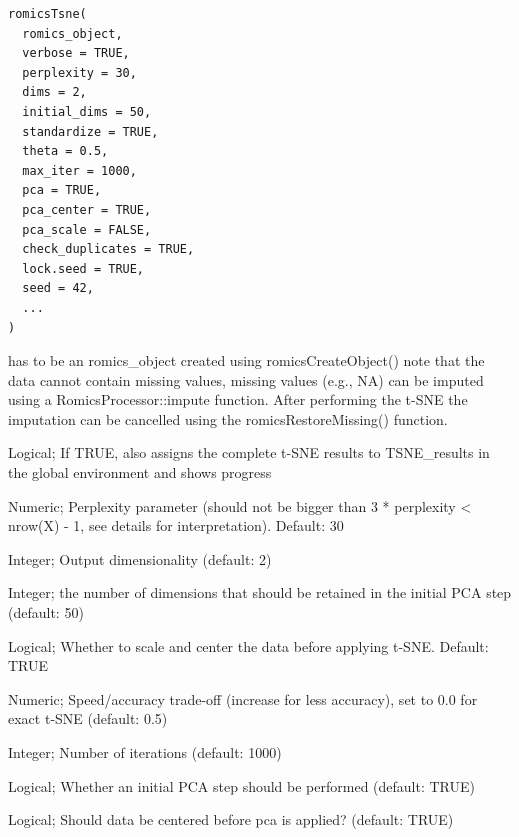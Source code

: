 \documentclass[a4paper]{book}
\begin{document}
%
\begin{Usage}
\begin{verbatim}
romicsTsne(
  romics_object,
  verbose = TRUE,
  perplexity = 30,
  dims = 2,
  initial_dims = 50,
  standardize = TRUE,
  theta = 0.5,
  max_iter = 1000,
  pca = TRUE,
  pca_center = TRUE,
  pca_scale = FALSE,
  check_duplicates = TRUE,
  lock.seed = TRUE,
  seed = 42,
  ...
)
\end{verbatim}
\end{Usage}
%
\begin{Arguments}
\begin{ldescription}
\item[\code{romics\_object}] has to be an romics\_object created using romicsCreateObject() note that the data cannot contain missing values, missing values (e.g., NA) can be imputed using a RomicsProcessor::impute function. After performing the t-SNE the imputation can be cancelled using the romicsRestoreMissing() function.

\item[\code{verbose}] Logical; If TRUE, also assigns the complete t-SNE results to TSNE\_results in the global environment and shows progress

\item[\code{perplexity}] Numeric; Perplexity parameter (should not be bigger than 3 * perplexity < nrow(X) - 1, see details for interpretation). Default: 30

\item[\code{dims}] Integer; Output dimensionality (default: 2)

\item[\code{initial\_dims}] Integer; the number of dimensions that should be retained in the initial PCA step (default: 50)

\item[\code{standardize}] Logical; Whether to scale and center the data before applying t-SNE. Default: TRUE

\item[\code{theta}] Numeric; Speed/accuracy trade-off (increase for less accuracy), set to 0.0 for exact t-SNE (default: 0.5)

\item[\code{max\_iter}] Integer; Number of iterations (default: 1000)

\item[\code{pca}] Logical; Whether an initial PCA step should be performed (default: TRUE)

\item[\code{pca\_center}] Logical; Should data be centered before pca is applied? (default: TRUE)


\end{ldescription}
\end{Arguments}
\end{document}
